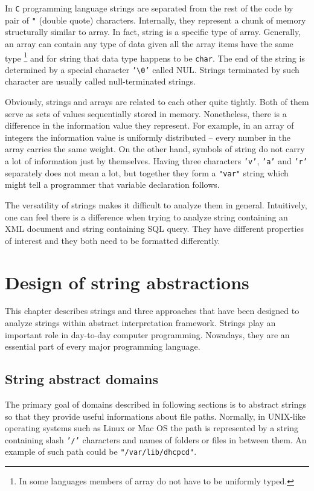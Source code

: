 \documentclass[12pt,final,oneside]{fithesis2}
\theoremstyle{definition}
\begin{document}
In \texttt{C} programming language strings are separated from the rest of
the code by pair of \texttt{"} (double quote) characters. Internally,
they represent a chunk of memory structurally similar to array. In fact,
string is a specific type of array. Generally, an array can contain any
type of data given all the array items have the same type \footnote{In some
languages members of array do not have to be uniformly typed.} and for
string that data type happens to be \texttt{char}. The end of the string is
determined by a special character \texttt{'\textbackslash0'} called NUL.
Strings terminated by such character are usually called null-terminated
strings.

Obviously, strings and arrays are related to each other quite tightly.
Both of them serve as sets of values sequentially stored in memory.
Nonetheless, there is a difference in the information value they represent.
For example, in an array of integers the information value is uniformly
distributed -- every number in the array carries the same weight. On the
other hand, symbols of string do not carry a lot of information just by
themselves. Having three characters \texttt{'v'}, \texttt{'a'} and
\texttt{'r'} separately does not mean a lot, but together they form
a \texttt{"var"} string which might tell a programmer that variable
declaration follows.

The versatility of strings makes it difficult to analyze them in general.
Intuitively, one can feel there is a difference when trying to analyze
string containing an XML document and string containing SQL query. They
have different properties of interest and they both need to be formatted
differently.


\chapter{Design of string abstractions}
\label{chap:design}

This chapter describes strings and three approaches that have been designed
to analyze strings within abstract interpretation framework. Strings play
an important role in day-to-day computer programming. Nowadays, they are
an essential part of every major programming language.


\section{String abstract domains}
\label{sec:stringabstractdomains}

The primary goal of domains described in following sections is to
abstract strings so that they provide useful informations about file
paths. Normally, in UNIX-like operating systems such as Linux or Mac OS
the path is represented by a string containing slash \texttt{'/'} characters
and names of folders or files in between them. An example of such path could
be \texttt{"/var/lib/dhcpcd"}.
\end{document}
